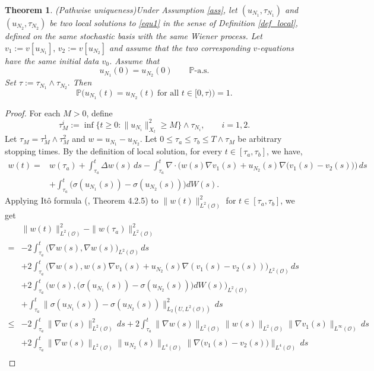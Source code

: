 \documentclass[reqno, 11pt]{amsart}
\newtheorem{thm}{Theorem}
\theoremstyle{definition}
\numberwithin{equation}{section} \numberwithin{lem}{section}
\numberwithin{thm}{section} \numberwithin{prop}{section}
\numberwithin{cor}{section} \numberwithin{rem}{section}
\numberwithin{defn}{section}
\begin{document}
\begin{thm}(Pathwise uniqueness)\label{thm3.2}
      Under Assumption \ref{ass}, let $(u_{N_1},\tau_{N_1})$ and $(u_{N_2},\tau_{N_2})$ be two local  solutions to \eqref{equ1} in the sense of Definition \ref{def_local}, defined on the same stochastic basis with
the same Wiener process. Let $v_1:=v[u_{N_1}], \,  v_2:=v[u_{N_2}]$
and assume that the two corresponding $v$-equations have the
same initial data $v_0$. Assume that
      \[
	u_{N_1}(0)=u_{N_2}(0)
	\qquad \mathbb P\text{-a.s.}
	\]
Set $\tau:=\tau_{N_1}\wedge\tau_{N_2}.$
Then
\[
\mathbb{P}\Big(u_{N_1}(t)=u_{N_2}(t)\ \text{for all } t\in[0,\tau)\Big)=1.
\]
   \end{thm}
   \begin{proof}
      For each $M>0$, define
\[
\tau_M^i:=\inf\{t\ge0:\|u_{N_i}\|_{X_t}^2\ge M\}\wedge\tau_{N_i}, \qquad i=1,2.
\]
       Let $\tau_M=\tau_M^1\wedge\tau_M^2$ and $w=u_{N_1}-u_{N_2}$.   Let $0\leq \tau_a\le \tau_b\leq T\wedge{\tau_{M}}$
be arbitrary stopping times. 
By the definition of  local  solution, for every $t\in[\tau_a,\tau_b]$, we have, 
\begin{align*}
    w(t)=&w(\tau_a)+\int_{\tau_a}^t\Delta w(s)\,ds- \int_{\tau_a}^t\nabla\cdot\big(w(s)\nabla v_1(s)+{u_{N_2}(s)}\nabla\big(v_1(s)-v_2(s)\big)\big)\,ds\\&+\int_{\tau_a}^t\big(\sigma({u_{N_1}}(s))-\sigma({u_{N_2}(s)})\big)dW(s).
\end{align*}
Applying It\^o formula (\cite{liu2015stochastic}, Theorem 4.2.5) to $\|w(t)\|_{L^2(\mathcal {O})}^2$ for $t\in[\tau_a,\tau_b]$, we get 
\begin{align}\label{w_1}
    \nonumber&\|w(t)\|_{L^2(\mathcal {O})}^2-\|w(\tau_a)\|_{L^2(\mathcal {O})}^2\\
    \nonumber=&-2\int_{\tau_a}^t\big(\nabla w(s),\nabla w(s)\big)_{L^2(\mathcal {O})}\,ds\\\nonumber&+2 \int_{\tau_a}^t\big(\nabla w(s),w(s)\nabla v_1(s)+{u_{N_2}}(s)\nabla (v_1(s)-v_2(s))\big)_{L^2(\mathcal {O})}\,ds\\
    \nonumber&+2\int_{\tau_a}^t\big(w(s),\big(\sigma({u_{N_1}}(s))-\sigma({u_{N_2}(s)})\big)dW(s)\big)_{L^2(\mathcal {O})}\\\nonumber&+\int_{\tau_a}^t\|\sigma({u_{N_1}}(s))-\sigma({u_{N_2}(s)})\|_{L_2(U,L^2(\mathcal {O}))}^2\,ds\\
    \nonumber\leq&-2\int_{\tau_a}^t\|\nabla w(s)\|_{L^2(\mathcal {O})}^2\,ds+2 \int_{\tau_a}^t\|\nabla w(s)\|_{L^2(\mathcal {O})}\| w(s)\|_{L^2(\mathcal {O})}\|\nabla v_1(s)\|_{L^\infty(\mathcal {O})}\,ds\\&\nonumber+2 \int_{\tau_a}^t\|\nabla w(s)\|_{L^2(\mathcal {O})}\|{u_{N_2}}(s)\|_{L^4(\mathcal {O})}\|\nabla\big(v_1(s)-v_2(s)\big)\|_{L^{4}(\mathcal {O})}\,ds\\

\end{align}
\end{proof}
\end{document}
